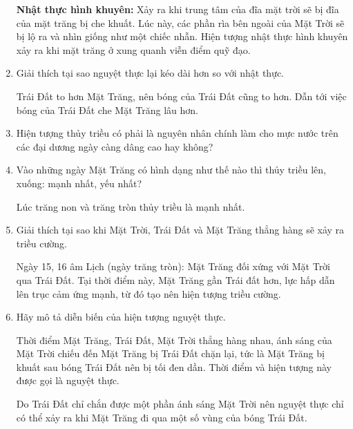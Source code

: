 \begin{enumerate}[label=\bfseries Câu \arabic*:]
{		\textbf{Nhật thực hình khuyên:} Xảy ra khi trung tâm của đĩa mặt trời sẽ bị đĩa của mặt trăng bị che khuất. Lúc này, các phần rìa bên ngoài của Mặt Trời sẽ bị lộ ra và nhìn giống như một chiếc nhẫn. Hiện tượng nhật thực hình khuyên xảy ra khi mặt trăng ở xung quanh viễn điểm quỹ đạo.
	}
	\item {}
	
	
	{
		Giải thích tại sao nguyệt thực lại kéo dài hơn so với nhật thực.
	}
	
	\hideall
	{
		Trái Đất to hơn Mặt Trăng, nên bóng của Trái Đất cũng to hơn. Dẫn tới việc bóng của Trái Đất che Mặt Trăng lâu hơn.
		
	}
	\item {}
	
	{
		Hiện tượng thủy triều có phải là nguyên nhân chính làm cho mực nước trên các đại dương ngày càng dâng cao hay không?
	}
	
	
	\item {}
	
	
	{
		Vào những ngày Mặt Trăng có hình dạng như thế nào thì thủy triều lên, xuống: mạnh nhất, yếu nhất?
	}
	
	\hideall
	{
		Lúc trăng non và trăng tròn thủy triều là mạnh nhất.
	}
	\item {}
	
	
	{
		Giải thích tại sao khi Mặt Trời, Trái Đất và Mặt Trăng thẳng hàng sẽ xảy ra triều cường.
	}
	
	\hideall
	{
		Ngày 15, 16 âm Lịch (ngày trăng tròn): Mặt Trăng đối xứng với Mặt Trời qua Trái Đất. Tại thời điểm này, Mặt Trăng gần Trái đất hơn, lực hấp dẫn lên trục cảm ứng mạnh, từ đó tạo nên hiện tượng triều cường.
	}
	\item {}
	
	
	{
		Hãy mô tả diễn biến của hiện tượng nguyệt thực.
	}
	
	\hideall
	{
		Thời điểm Mặt Trăng, Trái Đất, Mặt Trời thẳng hàng nhau, ánh sáng của Mặt Trời chiếu đến Mặt Trăng bị Trái Đất chặn lại, tức là Mặt Trăng bị khuất sau bóng Trái Đất nên bị tối đen dần. Thời điểm và hiện tượng này được gọi là nguyệt thực.
		
		Do Trái Đất chỉ chắn được một phần ánh sáng Mặt Trời nên nguyệt thực chỉ có thể xảy ra khi Mặt Trăng đi qua một số vùng của bóng Trái Đất.
		
}
\end{enumerate}
